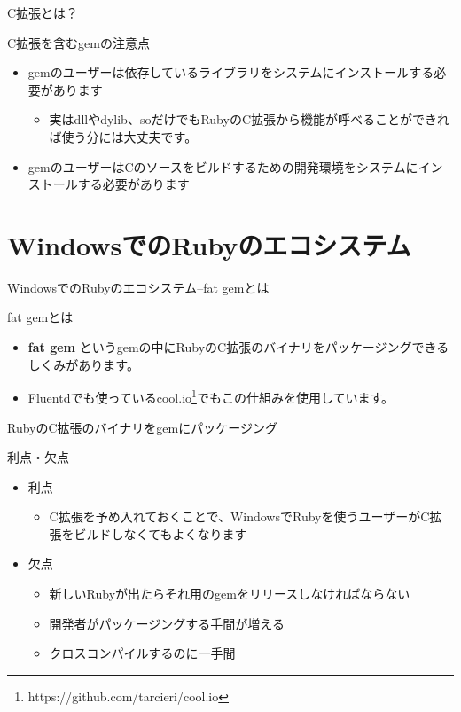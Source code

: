 \documentclass[12pt, unicode]{beamer}
\begin{document}
\begin{frame}{C拡張とは？}
  \begin{block}{C拡張を含むgemの注意点}
    \begin{itemize}
    \item gemのユーザーは依存しているライブラリをシステムにインストールする必要があります
       {
        \begin{itemize}
        \item \alert{実はdllやdylib、soだけでもRubyのC拡張から機能が呼べることができれば使う分には大丈夫です。}
        \end{itemize}
      }
    \item gemのユーザーはCのソースをビルドするための開発環境をシステムにインストールする必要があります
    \end{itemize}
  \end{block}
\end{frame}

\section[]{WindowsでのRubyのエコシステム}
\begin{frame}{WindowsでのRubyのエコシステム\small{–fat gemとは}}
  \begin{block}{fat gemとは}
    \begin{itemize}
    \item {\bf fat gem} というgemの中にRubyのC拡張のバイナリをパッケージングできるしくみがあります。
    \item Fluentdでも使っているcool.io\footnote[frame]{https://github.com/tarcieri/cool.io}でもこの仕組みを使用しています。
    \end{itemize}
  \end{block}
\end{frame}

\begin{frame}{RubyのC拡張のバイナリをgemにパッケージング}
  \begin{block}{利点・欠点}
    \begin{itemize}
    \item 利点
      \begin{itemize}
        \item C拡張を予め入れておくことで、WindowsでRubyを使うユーザーがC拡張をビルドしなくてもよくなります
      \end{itemize}
    \item 欠点
      \begin{itemize}
        \item 新しいRubyが出たらそれ用のgemをリリースしなければならない
        \item 開発者がパッケージングする手間が増える
        \item クロスコンパイルするのに一手間
      \end{itemize}
    \end{itemize}
  \end{block}
\end{frame}
\end{document}

